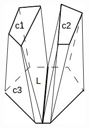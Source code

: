 \documentclass[3p,times]{elsarticle}
\begin{document}
\begin{figure}[ht]
\begin{subfigure}[b]{0.1\textwidth}
\includegraphics[width=\textwidth]{../picture/branch-but.png}
\caption{}
\label{fig:branch-but}
\end{subfigure}
~
\begin{subfigure}[b]{0.1\textwidth}

\end{subfigure}
\end{figure}
\end{document}
